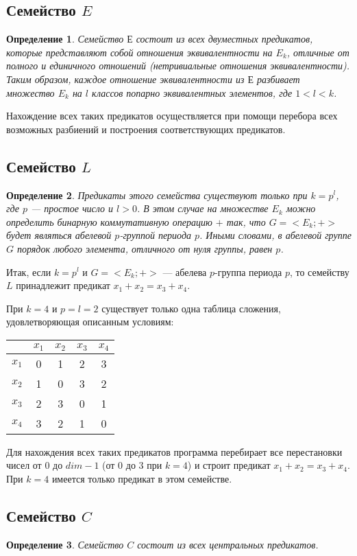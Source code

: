 \documentclass[a4paper,14pt]{extreport}
\newtheorem{opr}{Определение}
\begin{document}
\subsection{Семейство $E$}
\begin{opr}
Семейство $Е$ состоит из всех двуместных предикатов, которые  представляют собой отношения эквивалентности на $E_{k}$, отличные от полного и единичного отношений (нетривиальные отношения эквивалентности). Таким образом, каждое отношение эквивалентности из $Е$ разбивает множество $E_{k}$ на $l$ классов попарно эквивалентных элементов, где $1 < l < k$. 
\end{opr}
Нахождение всех таких предикатов осуществляется при помощи перебора всех возможных разбиений и построения соответствующих предикатов. 

\subsection{Семейство $L$}
\begin{opr}
Предикаты этого семейства существуют только при $k = p^l$, где $p$ — простое число и $l > 0$. В этом случае на множестве $E_k$ можно определить бинарную коммутативную операцию $+$ так, 
что $G = <E_k;+>$ будет являться абелевой $p$-группой периода $p$. Иными словами, в абелевой группе $G$ порядок любого элемента, отличного от нуля группы, равен $p$. 
\end{opr}
Итак, если $k = p^l$ и $G = <E_k; +>$ — абелева $p$-группа периода $p$, то семейству $L$ принадлежит предикат $x_1+x_2=x_3+x_4$. 

При $k=4$ и $p=l=2$ существует только одна таблица сложения, удовлетворяющая описанным условиям: 
\begin{center}
\begin{tabular}{|c|c|c|c|c|}
\hline
&$x_1$&$x_2$&$x_3$&$x_4$\\
\hline
$x_1$&0&1&2&3\\
\hline
$x_2$&1&0&3&2\\
\hline
$x_3$&2&3&0&1\\
\hline
$x_4$&3&2&1&0\\
\hline
\end{tabular}
\end{center}

Для нахождения всех таких предикатов программа перебирает все перестановки чисел от $0$ до $dim-1$ (от $0$ до $3$ при $k=4$) и строит предикат $x_1+x_2=x_3+x_4$. При $k=4$ имеется только предикат в этом семействе.
\subsection{Семейство $C$}
\begin{opr}
Семейство $C$ состоит из всех центральных предикатов.
\end{opr}
\end{document}
